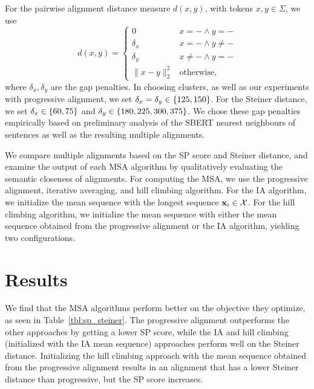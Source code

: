 \documentclass{article}
\begin{document}
For the pairwise alignment distance measure $d(x, y)$, with tokens $x,y\in\Sigma$,
we use
\begin{equation} 
d(x,y) = \begin{cases}
0 & x=- \wedge y=-\\
\delta_x & x=- \wedge y\ne- \\
\delta_y & x\ne- \wedge y = -\\
\|x-y\|_2^2 & \mathrm{otherwise,}
\end{cases}
\end{equation}
where $\delta_x,\delta_y$ are the gap penalties.
In choosing clusters, as well as our experiments with progressive alignment,
we set $\delta_x=\delta_y \in \left\{125, 150\right\}$.
For the Steiner distance, we set $\delta_x \in \left\{60, 75\right\}$
and $\delta_y \in \left\{180, 225, 300, 375\right\}$.
We chose these gap penalties empirically based on preliminary analysis of the SBERT
nearest neighbours of sentences as well as the resulting multiple alignments.

We compare multiple alignments based on the SP score and Steiner distance,
and examine the output of each MSA algorithm by qualitatively evaluating the 
semantic closeness of alignments.
For computing the MSA, we use the progressive alignment, iterative averaging,
and hill climbing algorithm.
For the IA algorithm, we initialize the mean sequence with the longest sequence $\mathbf{x}_i \in \mathcal{X}$.
For the hill climbing algorithm, we initialize the mean sequence with
either the mean sequence obtained from the progressive alignment or the IA algorithm,
yielding two configurations.

\section{Results}
We find that the MSA algorithms perform better on the objective they optimize,
as seen in Table~\ref{tbl:sp_steiner}.
The progressive alignment outperforms the other approaches by getting a lower SP score,
while the IA and hill climbing (initialized with the IA mean sequence)
approaches perform well on the Steiner distance.
Initializing the hill climbing approach with the mean sequence obtained from 
the progressive alignment results in an alignment that has a lower Steiner distance
than progressive, but the SP score increases.
\end{document}

